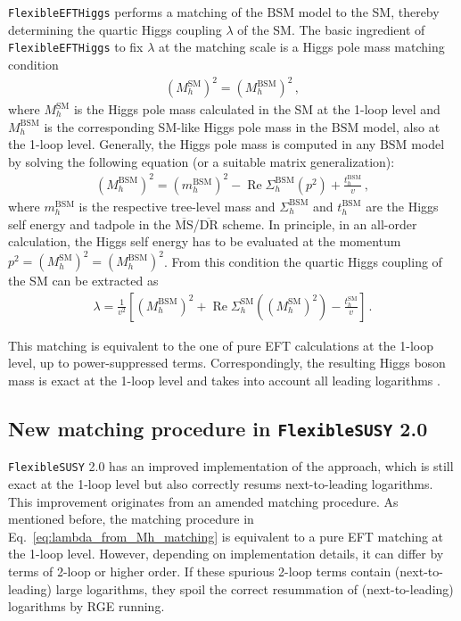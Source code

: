 \documentclass[final,3p,11pt,pdflatex]{elsarticle}
\makeatletter
\newcommand{\fs}{\texttt{FlexibleSUSY}\@\xspace}
\newcommand{\fstwo}{\fs 2.0\@\xspace}
\newcommand{\feft}{\texttt{Flex\-ib\-le\-EFT\-Higgs}\@\xspace}
\newcommand{\ol}[1]{\overline{#1}}
\newcommand{\MSbar}{\ensuremath{\ol{\text{MS}}}\xspace}
\newcommand{\DRbar}{\ensuremath{\ol{\text{DR}}}\xspace}
\newcommand{\SM}{\ensuremath{\text{SM}}\xspace}
\newcommand{\BSM}{\ensuremath{\text{BSM}}\xspace}
\DeclareMathOperator{\re}{Re}
\makeatother
\begin{document}
\feft performs a matching of the \BSM model to the SM,
thereby determining the quartic Higgs coupling $\lambda$ of the
SM\@.  The basic ingredient of \feft to fix $\lambda$ at
the matching scale is a Higgs pole mass matching condition
%
\begin{align}
  (M_h^\SM)^2 = (M_h^\BSM)^2 \,,
  \label{eq:Higgs_pole_mass_matching}
\end{align}
%
where $M_h^\SM$ is the Higgs pole mass calculated in the SM at the 1-loop level and $M_h^\BSM$ is the corresponding SM-like
Higgs pole mass in the \BSM model, also at the 1-loop
level.
Generally, the Higgs pole mass is computed in any \BSM model
by solving the following
equation (or a suitable matrix generalization):
%
\begin{align}
  (M_h^\BSM)^2 = (m_h^\BSM)^2 - \re\Sigma_h^{\BSM}(p^2) + \frac{t_h^\BSM}{v} \,,
  \label{eq:Mh_mom_iteration}
\end{align}
%
where $m_h^\BSM$ is the respective tree-level mass and
$\Sigma_h^{\BSM}$ and $t_h^\BSM$ are the Higgs self
energy and tadpole in the \MSbar/\DRbar scheme.
In principle, in an all-order calculation,  the
Higgs self energy has to be evaluated at the momentum $p^2 =
(M_h^\SM)^2=(M_h^\BSM)^2$.
  From this condition the quartic Higgs coupling of the SM can be extracted as
%
\begin{align}
  \lambda = \frac{1}{v^2} \left[
     (M_h^\BSM)^2 + \re\Sigma_h^{\SM}((M_h^\SM)^2) - \frac{t_h^\SM}{v}
  \right] \,.
  \label{eq:lambda_from_Mh_matching}
\end{align}
%

This matching is equivalent
to the one of pure EFT calculations \cite{Bagnaschi:2014rsa,Vega:2015fna} at the
1-loop level, up to power-suppressed terms. Correspondingly, the resulting
Higgs boson mass is exact at the 1-loop level and takes into account
all leading logarithms \cite{Athron:2016fuq}.

\subsection{New matching procedure in \fstwo}
\label{sec:FS-2_matching_procedure}

\fstwo has an improved implementation of the approach, which is
still exact at the 1-loop level but also
correctly resums next-to-leading logarithms.
This improvement originates from an amended
matching procedure. As mentioned before, the matching procedure
in Eq.~\eqref{eq:lambda_from_Mh_matching}
is equivalent to a pure EFT matching at the 1-loop level. However,
depending on implementation details, it can differ by terms of
2-loop or higher order. If these spurious 2-loop terms contain
 (next-to-leading) large logarithms, they spoil the correct
resummation of (next-to-leading) logarithms by RGE running.
\end{document}
